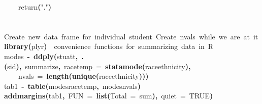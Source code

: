 \documentclass[12pt]{article}
\makeatletter
\newcommand{\hlnumber}[1]{\textcolor[rgb]{0,0,0}{#1}}%
\newcommand{\hlfunctioncall}[1]{\textcolor[rgb]{0.501960784313725,0,0.329411764705882}{\textbf{#1}}}%
\newcommand{\hlstring}[1]{\textcolor[rgb]{0.6,0.6,1}{#1}}%
\newcommand{\hlkeyword}[1]{\textcolor[rgb]{0,0,0}{\textbf{#1}}}%
\newcommand{\hlargument}[1]{\textcolor[rgb]{0.690196078431373,0.250980392156863,0.0196078431372549}{#1}}%
\newcommand{\hlcomment}[1]{\textcolor[rgb]{0.180392156862745,0.6,0.341176470588235}{#1}}%
\newcommand{\hlassignement}[1]{\textcolor[rgb]{0,0,0}{\textbf{#1}}}%
\newcommand{\hlsymbol}[1]{\textcolor[rgb]{0,0,0}{#1}}%
\newcommand{\hlstd}[1]{\textcolor[rgb]{0,0,0}{#1}}%
\newenvironment{kframe}{%
 \def\FrameCommand##1{\hskip\@totalleftmargin \hskip-\fboxsep
 \colorbox{shadecolor}{##1}\hskip-\fboxsep
     \hskip-\linewidth \hskip-\@totalleftmargin \hskip\columnwidth}%
 \MakeFramed {\advance\hsize-\width
   \@totalleftmargin\z@ \linewidth\hsize
   \@setminipage}}%
 {\par\unskip\endMakeFramed}
\newenvironment{knitrout}{}{} %
\renewenvironment{knitrout}{\begin{footnotesize}}{\end{footnotesize}}
\makeatother
\begin{document}
\begin{knitrout}
\begin{kframe}
\begin{flushleft}
\hlstd{}{\ }{\ }{\ }{\ }\hlsymbol{return}\hlfunctioncall{}\hlkeyword{(}\hlstring{"{}."{}}\hlkeyword{)}\hspace*{\fill}\\
\hlstd{}\hlkeyword{\usebox{\hlnormalsizeboxclosebrace}}\hspace*{\fill}\\
\hlstd{}\hspace*{\fill}\\
\hlstd{}\hlcomment{\usebox{\hlnormalsizeboxhash}{\ }Create{\ }new{\ }data{\ }frame{\ }for{\ }individual{\ }student{\ }Create{\ }nvals{\ }while{\ }we{\ }are{\ }at{\ }it}\hspace*{\fill}\\
\hlstd{}\hlfunctioncall{library}\hlkeyword{(}\hlsymbol{plyr}\hlkeyword{)}{\ }{\ }\hlcomment{\usebox{\hlnormalsizeboxhash}{\ }convenience{\ }functions{\ }for{\ }summarizing{\ }data{\ }in{\ }R}\hspace*{\fill}\\
\hlstd{}\hlsymbol{modes}{\ }\hlassignement{\usebox{\hlnormalsizeboxlessthan}-}{\ }\hlfunctioncall{ddply}\hlkeyword{(}\hlsymbol{stuatt}\hlkeyword{,}{\ }\hlfunctioncall{.}\hlkeyword{(}\hlsymbol{sid}\hlkeyword{)}\hlkeyword{,}{\ }\hlsymbol{summarize}\hlkeyword{,}{\ }\hlargument{race\usebox{\hlnormalsizeboxunderscore}temp}{\ }\hlargument{=}{\ }\hlfunctioncall{statamode}\hlkeyword{(}\hlsymbol{race\usebox{\hlnormalsizeboxunderscore}ethnicity}\hlkeyword{)}\hlkeyword{,}\hspace*{\fill}\\
\hlstd{}{\ }{\ }{\ }{\ }\hlargument{nvals}{\ }\hlargument{=}{\ }\hlfunctioncall{length}\hlkeyword{(}\hlfunctioncall{unique}\hlkeyword{(}\hlsymbol{race\usebox{\hlnormalsizeboxunderscore}ethnicity}\hlkeyword{)}\hlkeyword{)}\hlkeyword{)}\hspace*{\fill}\\
\hlstd{}\hlsymbol{tab1}{\ }\hlassignement{\usebox{\hlnormalsizeboxlessthan}-}{\ }\hlfunctioncall{table}\hlkeyword{(}\hlsymbol{modes}\hlkeyword{\usebox{\hlnormalsizeboxdollar}}\hlsymbol{race\usebox{\hlnormalsizeboxunderscore}temp}\hlkeyword{,}{\ }\hlsymbol{modes}\hlkeyword{\usebox{\hlnormalsizeboxdollar}}\hlsymbol{nvals}\hlkeyword{)}\hspace*{\fill}\\
\hlstd{}\hlfunctioncall{addmargins}\hlkeyword{(}\hlsymbol{tab1}\hlkeyword{,}{\ }\hlargument{FUN}{\ }\hlargument{=}{\ }\hlfunctioncall{list}\hlkeyword{(}\hlargument{Total}{\ }\hlargument{=}{\ }\hlsymbol{sum}\hlkeyword{)}\hlkeyword{,}{\ }\hlargument{quiet}{\ }\hlargument{=}{\ }\hlnumber{TRUE}\hlkeyword{)}\mbox{}
\normalfont
\end{flushleft}
\end{kframe}
\end{knitrout}
\end{document}
